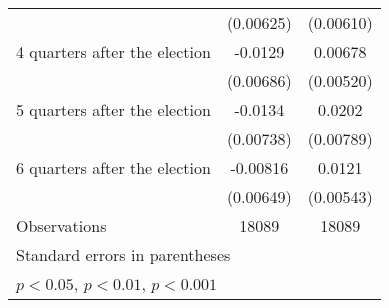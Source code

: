 \begin{table}[htbp]
\begin{tabular}{l*{2}{c}}
                    &   (0.00625)         &   (0.00610)         \\
[1em]
 4 quarters after the election&     -0.0129         &     0.00678         \\
                    &   (0.00686)         &   (0.00520)         \\
[1em]
 5 quarters after the election&     -0.0134         &      0.0202\sym{*}  \\
                    &   (0.00738)         &   (0.00789)         \\
[1em]
 6 quarters after the election&    -0.00816         &      0.0121\sym{*}  \\
                    &   (0.00649)         &   (0.00543)         \\
\hline
Observations        &       18089         &       18089         \\
\hline\hline
\multicolumn{3}{l}{\footnotesize Standard errors in parentheses}\\
\multicolumn{3}{l}{\footnotesize \sym{*} \(p<0.05\), \sym{**} \(p<0.01\), \sym{***} \(p<0.001\)}\\
\end{tabular}
\end{table}
